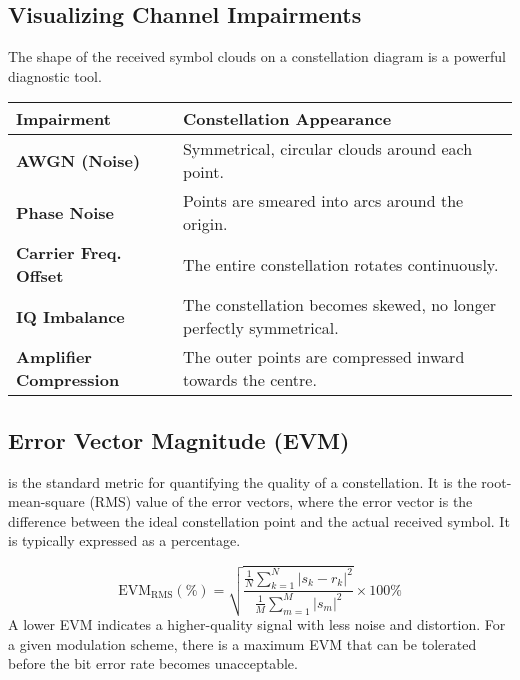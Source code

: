\subsection{Visualizing Channel Impairments}

The shape of the received symbol clouds on a constellation diagram is a powerful diagnostic tool.

\begin{centre}
    \begin{tabular}{@{}ll@{}}
        \toprule
        \tableheaderfont Impairment & \tableheaderfont Constellation Appearance \\
        \midrule
        \textbf{AWGN (Noise)} & Symmetrical, circular clouds around each point. \\
        \textbf{Phase Noise} & Points are smeared into arcs around the origin. \\
        \textbf{Carrier Freq. Offset} & The entire constellation rotates continuously. \\
        \textbf{IQ Imbalance} & The constellation becomes skewed, no longer perfectly symmetrical. \\
        \textbf{Amplifier Compression} & The outer points are compressed inward towards the centre. \\
        \bottomrule
    \end{tabular}
\end{centre}


\subsection{Error Vector Magnitude (EVM)}

 is the standard metric for quantifying the quality of a constellation. It is the root-mean-square (RMS) value of the error vectors, where the error vector is the difference between the ideal constellation point and the actual received symbol. It is typically expressed as a percentage.

\begin{equation}
    \text{EVM}_{\text{RMS}} (\%) = \sqrt{\frac{\frac{1}{N}\sum_{k=1}^{N}|s_k - r_k|^2}{\frac{1}{M}\sum_{m=1}^{M}|s_m|^2}} \times 100\%
\end{equation}
A lower EVM indicates a higher-quality signal with less noise and distortion. For a given modulation scheme, there is a maximum EVM that can be tolerated before the bit error rate becomes unacceptable.

